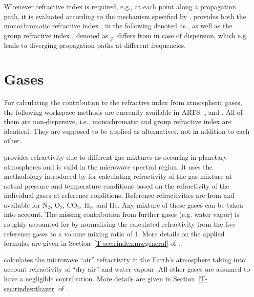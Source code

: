Whenever refractive index is required, e.g., at each point along a propagation 
path, it is evaluated according to the mechanism specified by 
.  provides both the 
monochromatic refractive index , in the following denoted as \Rfr, as well 
as the group refractive index , denoted as \Rfr$_{g}$.
 differs from  in case of dispersion, which e.g. leads to diverging propagation paths at different frequencies.


\section{Gases}
%
For calculating the contribution to the refractive index from atmospheric gases, the following workspace methods are currently available in ARTS: ,
 and . All of them are
non-dispersive, i.e., monochromatic and group refractive index are identical.
They are supposed to be applied as alternatives, not in addition to each other.

 provides refractivity due to different gas
mixtures as occuring in planetary atmospheres and is valid in the microwave
spectral region. It uses the methodology introduced by
\citet{newell65:_absolute_jap} for calculating refractivity of the gas mixture
at actual pressure and temperature conditions based on the refractivity of the
individual gases at reference conditions. Reference refractivities are from
\citet{newell65:_absolute_jap} and available for N$_2$, O$_2$, CO$_2$, H$_2$,
and He. Any mixture of these gases can be taken into account. The missing
contribution from further gases (e.g. water vapor) is roughly accounted for by
normalising the calculated refractivity from the five reference gases to a
volume mixing ratio of 1. More details on the applied formulas are given in
Section~\ref{T-sec:rindex:mwgeneral} of \theory.

 calculates the microwave ``air'' refractivity
in the Earth's atmosphere taking into account refractivity of ``dry air'' and water vapour. All other gases are assumed to have a negligible contribution. More details are given in
Section~\ref{T-sec:rindex:thayer} of \theory.

